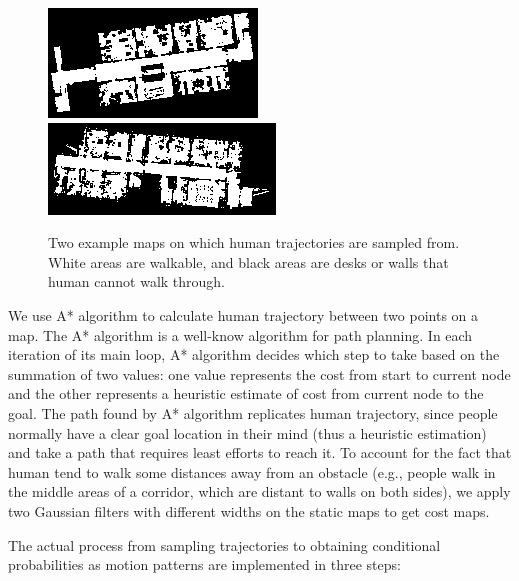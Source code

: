 \begin{figure}[ht]
  \centering
    \includegraphics[width=.8\textwidth, height=.3\textwidth]{figures/map1.png}
    \includegraphics[width=.8\textwidth, height=.3\textwidth]{figures/map2.png}
    \caption[Two example maps on which human trajectories are sampled from.]{Two example maps on which human trajectories are sampled from. White areas are walkable, and black areas are desks or walls that human cannot walk through.}
    \label{fig:maps}
\end{figure} 

We use A* algorithm to calculate human trajectory between two points on a map. The A* algorithm is a well-know algorithm for path planning. In each iteration of its main loop, A* algorithm decides which step to take based on the summation of two values: one value represents the cost from start to current node and the other represents a heuristic estimate of cost from current node to the goal. The path found by A* algorithm replicates human trajectory, since people normally have a clear goal location in their mind (thus a heuristic estimation) and take a path that requires least efforts to reach it. To account for the fact that human tend to walk some distances away from an obstacle (e.g., people walk in the middle areas of a corridor, which are distant to walls on both sides), we apply two Gaussian filters with different widths on the static maps to get cost maps.  

The actual process from sampling trajectories to obtaining conditional probabilities as motion patterns are implemented in three steps:

